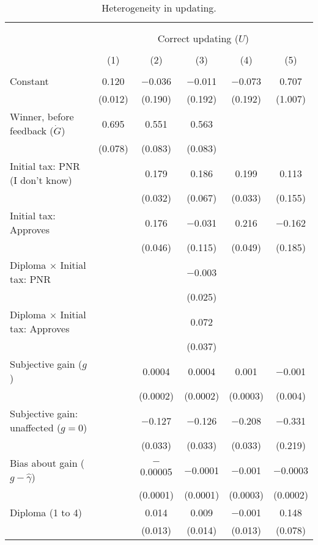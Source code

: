 
\begin{table}[!htbp] \centering 
  \caption{Heterogeneity in updating.} 
  \label{tab:heterogeneity_update} 
\begin{tabular}{@{\extracolsep{5pt}}lccccc} 
\\[-1.8ex]\hline 
\hline \\[-1.8ex] 
\\[-1.8ex] & \multicolumn{5}{c}{Correct updating ($U$)} \\ 
\\[-1.8ex] & (1) & (2) & (3) & (4) & (5)\\ 
\hline \\[-1.8ex] 
 Constant & 0.120 & $-$0.036 & $-$0.011 & $-$0.073 & 0.707 \\ 
  & (0.012) & (0.190) & (0.192) & (0.192) & (1.007) \\ 
  Winner, before feedback ($\dot{G}$) & 0.695 & 0.551 & 0.563 &  &  \\ 
  & (0.078) & (0.083) & (0.083) &  &  \\ 
  Initial tax: PNR (I don't know) &  & 0.179 & 0.186 & 0.199 & 0.113 \\ 
  &  & (0.032) & (0.067) & (0.033) & (0.155) \\ 
  Initial tax: Approves &  & 0.176 & $-$0.031 & 0.216 & $-$0.162 \\ 
  &  & (0.046) & (0.115) & (0.049) & (0.185) \\ 
  Diploma $\times$ Initial tax: PNR &  &  & $-$0.003 &  &  \\ 
  &  &  & (0.025) &  &  \\ 
  Diploma $\times$ Initial tax: Approves &  &  & 0.072 &  &  \\ 
  &  &  & (0.037) &  &  \\ 
  Subjective gain ($g$) &  & 0.0004 & 0.0004 & 0.001 & $-$0.001 \\ 
  &  & (0.0002) & (0.0002) & (0.0003) & (0.004) \\ 
  Subjective gain: unaffected ($g=0$) &  & $-$0.127 & $-$0.126 & $-$0.208 & $-$0.331 \\ 
  &  & (0.033) & (0.033) & (0.033) & (0.219) \\ 
  Bias about gain ($g - \hat{\gamma}$) &  & $-$0.00005 & $-$0.0001 & $-$0.001 & $-$0.0003 \\ 
  &  & (0.0001) & (0.0001) & (0.0003) & (0.0002) \\ 
  Diploma (1 to 4) &  & 0.014 & 0.009 & $-$0.001 & 0.148 \\ 
  &  & (0.013) & (0.014) & (0.013) & (0.078) \\ 

\end{tabular}
\end{table}
